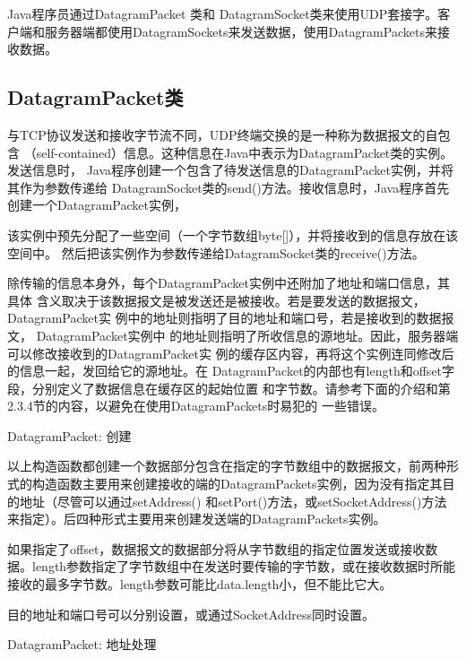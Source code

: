 	Java程序员通过DatagramPacket 类和 DatagramSocket类来使用UDP套接字。客户端和服务器端都使用DatagramSockets来发送数据，使用DatagramPackets来接收数据。 

	\subsection{DatagramPacket类} 

		与TCP协议发送和接收字节流不同，UDP终端交换的是一种称为数据报文的自包含
		（self-contained）信息。这种信息在Java中表示为DatagramPacket类的实例。发送信息时，
		Java程序创建一个包含了待发送信息的DatagramPacket实例，并将其作为参数传递给
		DatagramSocket类的send()方法。接收信息时，Java程序首先创建一个DatagramPacket实例，

		该实例中预先分配了一些空间（一个字节数组byte[]），并将接收到的信息存放在该空间中。
		然后把该实例作为参数传递给DatagramSocket类的receive()方法。 

		除传输的信息本身外，每个DatagramPacket实例中还附加了地址和端口信息，其具体
		含义取决于该数据报文是被发送还是被接收。若是要发送的数据报文， DatagramPacket实
		例中的地址则指明了目的地址和端口号，若是接收到的数据报文， DatagramPacket实例中
		的地址则指明了所收信息的源地址。因此，服务器端可以修改接收到的DatagramPacket实
		例的缓存区内容，再将这个实例连同修改后的信息一起，发回给它的源地址。在
		DatagramPacket的内部也有length和offset字段，分别定义了数据信息在缓存区的起始位置
		和字节数。请参考下面的介绍和第2.3.4节的内容，以避免在使用DatagramPackets时易犯的
		一些错误。 

		DatagramPacket: 创建 

		

		以上构造函数都创建一个数据部分包含在指定的字节数组中的数据报文，前两种形式的构造函数主要用来创建接收的端的DatagramPackets实例，因为没有指定其目的地址（尽管可以通过setAddress() 和setPort()方法，或setSocketAddress()方法来指定）。后四种形式主要用来创建发送端的DatagramPackets实例。 

		如果指定了offset，数据报文的数据部分将从字节数组的指定位置发送或接收数据。length参数指定了字节数组中在发送时要传输的字节数，或在接收数据时所能接收的最多字节数。length参数可能比data.length小，但不能比它大。 

		目的地址和端口号可以分别设置，或通过SocketAddress同时设置。 

		DatagramPacket: 地址处理 

		

